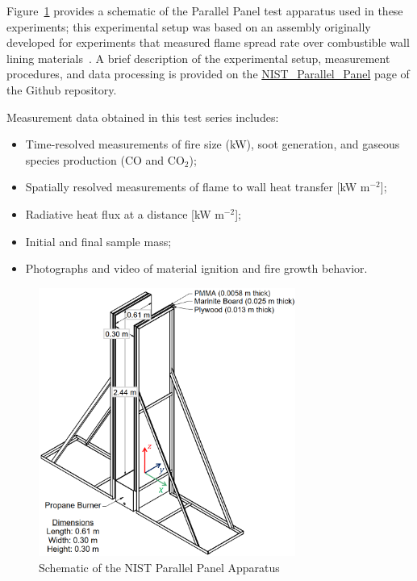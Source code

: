 \documentclass[12pt]{article}
\begin{document}
Figure~\ref{fig:Panel_Schematic} provides a schematic of the Parallel Panel test apparatus used in these experiments; this experimental setup was based on an assembly originally developed for experiments that measured flame spread rate over combustible wall lining materials~\cite{Beaulieu2007Parallel}. A brief description of the experimental setup, measurement procedures, and data processing is provided on the \href{https://github.com/MaCFP/macfp-db/tree/master/Fire_Growth/NIST_Parallel_Panel}{NIST\_Parallel\_Panel} page of the Github repository.

Measurement data obtained in this test series includes:
\begin{itemize}[noitemsep]
\item Time-resolved measurements of fire size (kW), soot generation, and gaseous species production (CO and CO$_2$);
\item Spatially resolved measurements of flame to wall heat transfer [kW m$^{-2}$];
\item Radiative heat flux at a distance [kW m$^{-2}$]; 
\item Initial and final sample mass; 
\item Photographs and video of material ignition and fire growth behavior.
\end{itemize}

\begin{figure}
     \centering
         \includegraphics[width=0.75\textwidth]{../../Fire_Growth/NIST_Parallel_Panel/Documentation/Panel_Assembly.png}
         \caption{Schematic of the NIST Parallel Panel Apparatus}
         \label{fig:Panel_Schematic}
\end{figure}
\end{document}
